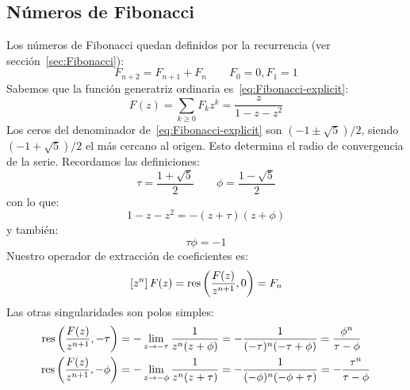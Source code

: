 \subsection{Números de Fibonacci}
\label{sec:complex-Fibonacci-numbers}

  Los números de Fibonacci quedan definidos por la recurrencia
  (ver sección~\ref{sec:Fibonacci}):%
  \begin{equation}
    \label{eq:Fibonacci-recurrence-2}
    F_{n + 2}
      = F_{n + 1} + F_n
    \qquad
    F_0 = 0, F_1 = 1
  \end{equation}
  Sabemos que la función generatriz ordinaria
  es~\eqref{eq:Fibonacci-explicit}:
  \begin{equation}
    \label{eq:Fibonacci-explicit}
    F(z)
      = \sum_{k \ge 0} F_k z^k
      = \frac{z}{1 - z - z^2}
  \end{equation}
  Los ceros del denominador de~\eqref{eq:Fibonacci-explicit}
  son \((-1 \pm \sqrt{5}) / 2\),
  siendo \((-1 + \sqrt{5}) / 2\) el más cercano al origen.
  Esto determina el radio de convergencia
  de la serie.
  Recordamos las definiciones:
  \begin{equation*}
    \tau
      = \frac{1 + \sqrt{5}}{2}
    \qquad
    \phi
      = \frac{1 - \sqrt{5}}{2}
  \end{equation*}
  con lo que:
  \begin{equation*}
    1 - z - z^2
      = - (z + \tau) (z + \phi)
  \end{equation*}
  y también:
  \begin{equation}
    \label{eq:phi*barphi}
    \tau \phi
      = -1
  \end{equation}
  Nuestro operador de extracción de coeficientes es:
  \begin{equation*}
    \left[ z^n \right] F(z)
      = \operatorname{res} \left( \frac{F(z)}{z^{n + 1}}, 0 \right)
      = F_n
  \end{equation*}
  Las otras singularidades son polos simples:
  \begin{align*}
    \operatorname{res} \left( \frac{F(z)}{z^{n + 1}}, -\tau \right)
      &= - \lim_{z \rightarrow -\tau}
	     \frac{1}{z^n (z + \phi)}
      = - \frac{1}{(-\tau)^n (-\tau + \phi)}
      = \frac{\phi^n}{\tau - \phi} \\
    \operatorname{res} \left( \frac{F(z)}{z^{n + 1}}, -\phi \right)
      &= - \lim_{z \rightarrow -\phi}
	     \frac{1}{z^n (z + \tau)}
      = - \frac{1}{(-\phi)^n (-\phi + \tau)}
      = - \frac{\tau^n}{\tau - \phi}
  \end{align*}
